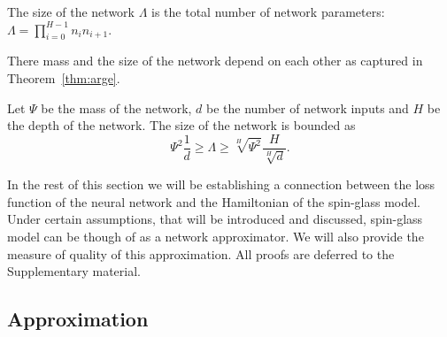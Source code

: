 \documentclass[twoside]{article}
\begin{document}
\begin{definition}
The size of the network $\Lambda$ is the total number of network parameters: $\Lambda = \prod_{i=0}^{H-1}n_in_{i+1}$.
\end{definition}

There mass and the size of the network depend on each other as captured in Theorem~\ref{thm:arge}.
\begin{theorem}
Let $\Psi$ be the mass of the network, $d$ be the number of network inputs and $H$ be the depth of the network. The size of the network is bounded as
\[\Psi^2\frac{1}{d} \geq \Lambda \geq \sqrt[H]{\Psi^2}\frac{H}{\sqrt[H]{d}}.
\]
\label{thm:arge}
\end{theorem}

In the rest of this section we will be establishing a connection between the loss function of the neural network and the Hamiltonian of the spin-glass model. Under certain assumptions, that will be introduced and discussed, spin-glass model can be though of as a network approximator. We will also provide the measure of quality of this approximation. All proofs are deferred to the Supplementary material.

\subsection{Approximation}
\end{document}

